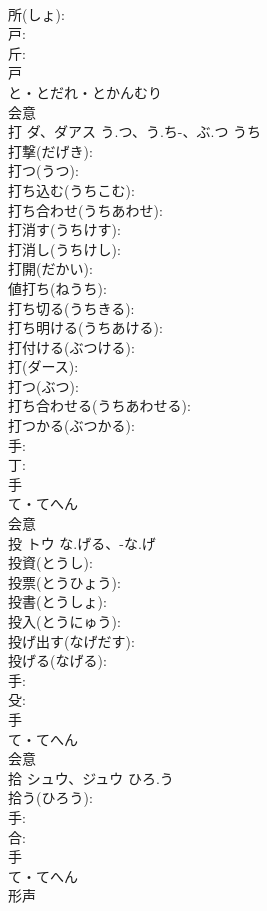 \documentclass[8pt]{extreport}
\begin{document}
\begin{CJK}{UTF8}{min}
\\	所(しょ): 
\\	戸: 
\\	斤: 
\\	戸	
\\	と・とだれ・とかんむり	
\\	会意 
\\	打	ダ、ダアス	う.つ、う.ち-、ぶ.つ	うち	
\\	打撃(だげき): 
\\	打つ(うつ): 
\\	打ち込む(うちこむ): 
\\	打ち合わせ(うちあわせ): 
\\	打消す(うちけす): 
\\	打消し(うちけし): 
\\	打開(だかい): 
\\	値打ち(ねうち): 
\\	打ち切る(うちきる): 
\\	打ち明ける(うちあける): 
\\	打付ける(ぶつける): 
\\	打(ダース): 
\\	打つ(ぶつ): 
\\	打ち合わせる(うちあわせる): 
\\	打つかる(ぶつかる): 
\\	手: 
\\	丁: 
\\	手	
\\	て・てへん	
\\	会意 
\\	投	トウ	な.げる、-な.げ		
\\	投資(とうし): 
\\	投票(とうひょう): 
\\	投書(とうしょ): 
\\	投入(とうにゅう): 
\\	投げ出す(なげだす): 
\\	投げる(なげる): 
\\	手: 
\\	殳: 
\\	手	
\\	て・てへん	
\\	会意 
\\	拾	シュウ、ジュウ	ひろ.う		
\\	拾う(ひろう): 
\\	手: 
\\	合: 
\\	手	
\\	て・てへん	
\\	形声 

\end{CJK}
\end{document}
